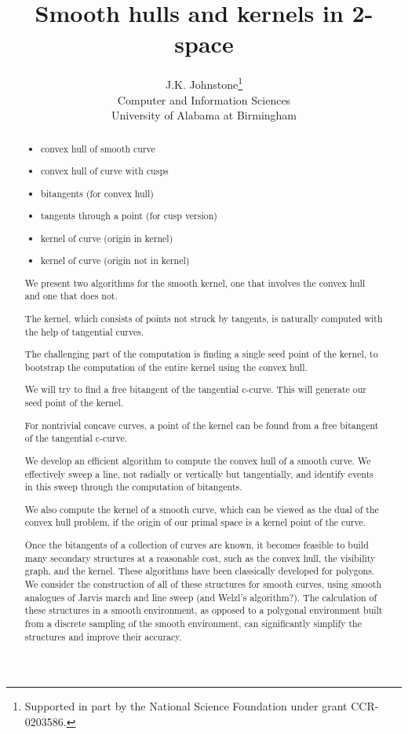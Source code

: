 \documentclass[12pt]{article}
\title{Smooth hulls and kernels in 2-space}
\author{J.K. Johnstone\thanks{Supported in part by the National Science Foundation
	under grant CCR-0203586.}\\
	Computer and Information Sciences\\
	University of Alabama at Birmingham}
\begin{document}
\maketitle

\begin{abstract}
\noindent
\begin{itemize}
\item	convex hull of smooth curve
\item	convex hull of curve with cusps
\item	bitangents (for convex hull)
\item	tangents through a point (for cusp version)
\item 	kernel of curve (origin in kernel)
\item	kernel of curve (origin not in kernel)
\end{itemize}

We present two algorithms for the smooth kernel,
one that involves the convex hull and one that does not.

The kernel, which consists of points not struck by tangents,
is naturally computed with the help of tangential curves.

The challenging part of the computation is finding
a single seed point of the kernel, to bootstrap the computation
of the entire kernel using the convex hull.

We will try to find a free bitangent of the tangential c-curve.
This will generate our seed point of the kernel.

For nontrivial concave curves, 
a point of the kernel can be found from a free bitangent
of the tangential c-curve.

We develop an efficient algorithm to compute the convex hull of a smooth curve.
We effectively sweep a line, not radially or vertically but tangentially,
and identify events in this sweep through the computation of bitangents.

We also compute the kernel of a smooth curve,
which can be viewed as the dual of the convex hull problem,
if the origin of our primal space is a kernel point of the curve.

Once the bitangents of a collection of curves are known, 
it becomes feasible to build many secondary structures at a reasonable cost,
such as the convex hull, the visibility graph, and the kernel.
These algorithms have been classically developed for polygons.
We consider the construction of all of these structures for smooth curves,
using smooth analogues of Jarvis march and line sweep (and Welzl's algorithm?).
The calculation of these structures in a smooth environment,
as opposed to a polygonal environment built from a discrete sampling of the
smooth environment, can significantly simplify the structures
and improve their accuracy.
\end{abstract}
\end{document}
